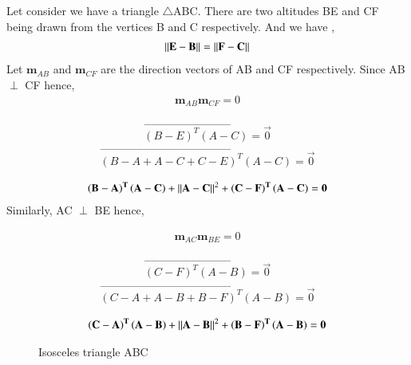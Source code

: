 
Let consider we have a triangle $\triangle$ABC. There are two altitudes BE and CF being  drawn from the vertices B and C respectively. And we have ,
 \begin{align}
 	\left\lVert\mathbf{E - B}\right\rVert = \left\lVert\mathbf{F - C}\right\rVert \label{eq:solutions/1/31/eq2.1}
 \end{align}
Let $\textbf{m}_{AB}$ and $\textbf{m}_{CF}$ are the direction vectors of AB and CF respectively. Since AB $\perp$ CF hence,
\begin{align}
 \textbf{m}_{AB} \textbf{m}_{CF} = 0
\end{align}

\begin{align}
 \vec{\left( B - E\right)^T \left(A - C \right)} =\vec{ 0}
\end{align}
\begin{align}
\vec{\left( B -  A + A - C + C - E\right)^T \left(A - C \right)} = \vec{0}
\end{align}

  \begin{align}
 \mathbf{ \left( B -  A \right)^T \left(A - C \right)} + \left\lVert\mathbf {A - C}\right\rVert^{2} + \mathbf{\left(C - F\right)^T \left(A - C \right)} = \mathbf{0} \label{eq:solutions/1/31/2.5}
  \end{align}
Similarly, AC $\perp$ BE hence,  


 \begin{align}
 \textbf{m}_{AC} \textbf{m}_{BE} = 0
 \end{align}
 
 \begin{align}
 \vec{\left( C - F\right)^T \left(A - B \right)} =\vec{ 0}
 \end{align}
 \begin{align}
 \vec{\left( C -  A + A - B + B - F\right)^T \left(A - B \right)} = \vec{0}
 \end{align}
 
 \begin{align}
 \mathbf{ \left( C-  A \right)^T \left(A - B \right)} + \left\lVert\mathbf {A - B}\right\rVert^{2} + \mathbf{\left(B - F\right)^T \left(A - B \right)} = \mathbf{0} \label{eq:solutions/1/31/2.9}
 \end{align}
   
\begin{figure}[!htb]
	\centering
	\resizebox{\columnwidth}{!}{}
	\caption{Isosceles triangle ABC}
\end{figure}
  
  
  
  
  

